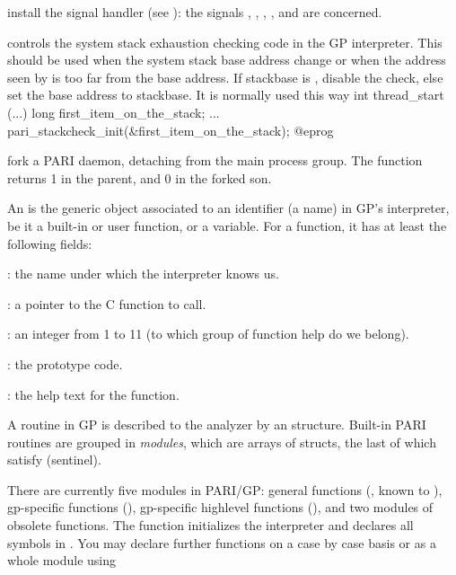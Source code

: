  install the signal handler 
(see ): the signals , , ,
,  and  are concerned.

 controls the system stack
exhaustion checking code in the GP interpreter. This should be used when the
system stack base address change or when the address seen by 
is too far from the base address. If stackbase is , disable the
check, else set the base address to stackbase. It is normally used this way
\bprog
int thread_start (...)
{
  long first_item_on_the_stack;
  ...
  pari_stackcheck_init(&first_item_on_the_stack);
}
@eprog

 fork a PARI daemon, detaching from the main
process group. The function returns 1 in the parent, and 0 in the
forked son.


An  is the generic object associated to an identifier (a name)
in GP's interpreter, be it a built-in or user function, or a variable. For
a function, it has at least the following fields:

  : the name under which the interpreter knows us.

  :  a pointer to the C function to call.

  : an integer from 1 to 11 (to which group of function
                    help do we belong).

  : the prototype code.

  : the help text for the function.

A routine in GP is described to the analyzer by an 
structure. Built-in PARI routines are grouped in \emph{modules}, which
are arrays of  structs, the last of which satisfy
 (sentinel).

There are currently five modules in PARI/GP: general functions
(, known to ), gp-specific functions
(), gp-specific highlevel functions
(), and two modules of obsolete functions. The
function  initializes the interpreter and declares all
symbols in . You may declare further functions on a
case by case basis or as a whole module using

